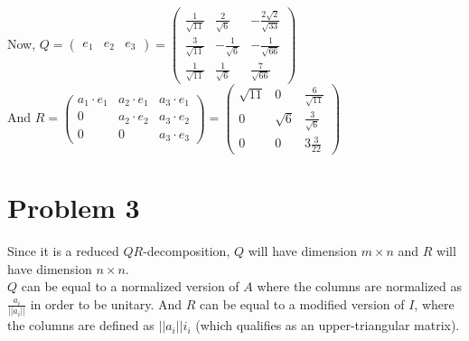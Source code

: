 \documentclass[fleqn]{article}
\begin{document}
Now, $Q=\begin{pmatrix}e_1&e_2&e_3\end{pmatrix}=\begin{pmatrix}\frac{1}{\sqrt{11}} & \frac{2}{\sqrt{6}} & -\frac{2\sqrt{2}}{\sqrt{33}}\\ \frac{3}{\sqrt{11}} & -\frac{1}{\sqrt{6}} & -\frac{1}{\sqrt{66}}\\ \frac{1}{\sqrt{11}} & \frac{1}{\sqrt{6}} & \frac{7}{\sqrt{66}}\end{pmatrix}$\\
And $R=\begin{pmatrix}a_1 \cdot e_1 & a_2 \cdot e_1 & a_3 \cdot e_1 \\ 0 & a_2 \cdot e_2 & a_3 \cdot e_2 \\ 0 & 0 & a_3 \cdot e_3\end{pmatrix}=\begin{pmatrix} \sqrt{11} & 0 & \frac{6}{\sqrt{11}}\\0 & \sqrt{6} & \frac{3}{\sqrt{6}}\\0&0&3\frac{3}{22}\end{pmatrix}$
\pagebreak
\section*{Problem 3}
Since it is a reduced $QR$-decomposition, $Q$ will have dimension $m\times n$ and $R$ will have dimension $n \times n$.\\ 
$Q$ can be equal to a normalized version of $A$ where the columns are normalized as $\frac{a_i}{||a_i||}$ in order to be unitary.  And $R$ can be equal to a modified version of $I$, where the columns are defined as $||a_i||i_i$ (which qualifies as an upper-triangular matrix).
\end{document}
